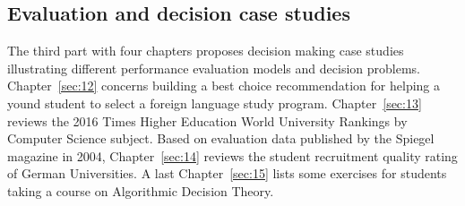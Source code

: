 % 
%
%

\begin{partbacktext}
\part{Evaluation and decision case studies}
\noindent The third part with four chapters proposes decision making case studies illustrating different performance evaluation models and decision problems. Chapter~\ref{sec:12} concerns building a best choice recommendation for helping a yound student to select a foreign language study program. Chapter~\ref{sec:13} reviews the 2016 Times Higher Education World University Rankings by Computer Science subject. Based on evaluation data published by the Spiegel magazine in 2004, Chapter~\ref{sec:14} reviews the student recruitment quality rating of German Universities. A last Chapter~\ref{sec:15} lists some exercises for students taking a course on Algorithmic Decision Theory. 
\end{partbacktext}